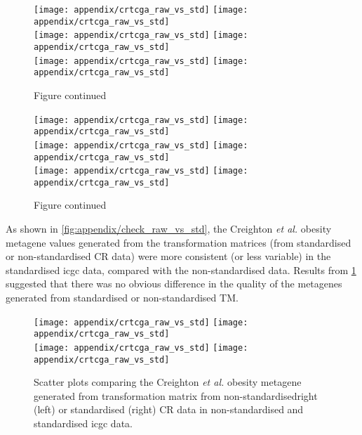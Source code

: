 \begin{appendices}
	\begin{figure}[htpb]
		\ContinuedFloat
		\captionsetup{list=off,format=cont}
		\centering
		\texttt{[image: appendix/crtcga\_raw\_vs\_std]}
		\hfill
		\texttt{[image: appendix/crtcga\_raw\_vs\_std]}\\
		\texttt{[image: appendix/crtcga\_raw\_vs\_std]}
		\hfill
		\texttt{[image: appendix/crtcga\_raw\_vs\_std]}\\
		\texttt{[image: appendix/crtcga\_raw\_vs\_std]}
		\hfill
		\texttt{[image: appendix/crtcga\_raw\_vs\_std]}\\
		\caption{Figure continued}
	\end{figure}

	\begin{figure}[htpb]
		\ContinuedFloat
		\captionsetup{list=off,format=cont}
		\centering
		\texttt{[image: appendix/crtcga\_raw\_vs\_std]}
		\hfill
		\texttt{[image: appendix/crtcga\_raw\_vs\_std]}\\
		\texttt{[image: appendix/crtcga\_raw\_vs\_std]}
		\hfill
		\texttt{[image: appendix/crtcga\_raw\_vs\_std]}\\
		\texttt{[image: appendix/crtcga\_raw\_vs\_std]}
		\hfill
		\texttt{[image: appendix/crtcga\_raw\_vs\_std]}\\
		\caption{Figure continued}
	\end{figure}

	\noindent
	As shown in \cref{fig:appendix/check_raw_vs_std}, the Creighton \textit{et al.} obesity metagene values generated from the transformation matrices (from standardised or non-standardised CR data) were more consistent (or less variable) in the standardised \gls{icgc} data, compared with the non-standardised data.
	Results from \cref{fig:appendix/check_raw_vs_std_tm} suggested that there was no obvious difference in the quality of the metagenes generated from standardised or non-standardised TM.

	\begin{figure}[h]
		\centering
		\texttt{[image: appendix/crtcga\_raw\_vs\_std]}
		\hfill
		\texttt{[image: appendix/crtcga\_raw\_vs\_std]}\\
		\texttt{[image: appendix/crtcga\_raw\_vs\_std]}
		\hfill
		\texttt{[image: appendix/crtcga\_raw\_vs\_std]}\\
		\caption{Scatter plots comparing the Creighton \textit{et al.} obesity metagene generated from transformation matrix from non-standardisedright (left) or standardised (right) CR data in non-standardised  and standardised  \gls{icgc} data.}
		\label{fig:appendix/check_raw_vs_std_tm}
	\end{figure}


\end{appendices}
